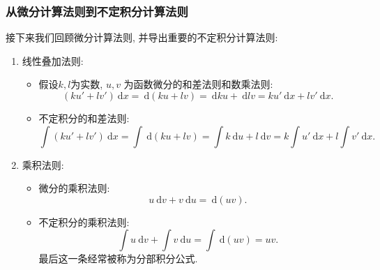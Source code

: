 \documentclass[
10pt,
aspectratio=43,
]{beamer}
\begin{document}
\begin{frame}
	\frametitle{从微分计算法则到不定积分计算法则}
	接下来我们回顾微分计算法则, 并导出重要的不定积分计算法则:\pause
	\begin{block}{}
		\begin{enumerate}
			\item 线性叠加法则:
			      \begin{itemize}
				      \item \pause 假设$k, l$为实数, $u, v$ 为函数微分的和差法则和数乘法则:
				            $$
					            (ku'+lv')\mathrm{~d}x=\mathrm{~d}(ku+ lv) = \mathrm{~d}ku + \mathrm{~d}lv=ku'\mathrm{~d}x+lv'\mathrm{~d}x.
				            $$
				      \item \pause 不定积分的和差法则:
				            $$
					            \int(ku'+lv')\mathrm{~d}x=\int\mathrm{~d}(ku+ lv) = \int k\mathrm{~d}u + l\mathrm{~d}v=k\int u'\mathrm{~d}x+l\int v'\mathrm{~d}x.
				            $$
			      \end{itemize}
			      \pause
			\item 乘积法则:
			      \begin{itemize}
				      \item \pause 微分的乘积法则:
				            $$
					            u\mathrm{~d}v+v\mathrm{~d}u =\mathrm{~d}(uv).
				            $$
				      \item \pause 不定积分的乘积法则:
				            $$
					            \int u\mathrm{~d}v+\int v\mathrm{~d}u=\int\mathrm{~d}(uv) = uv.
				            $$
				            \pause 最后这一条经常被称为分部积分公式.
			      \end{itemize}
		\end{enumerate}
	\end{block}
\end{frame}
\end{document}
